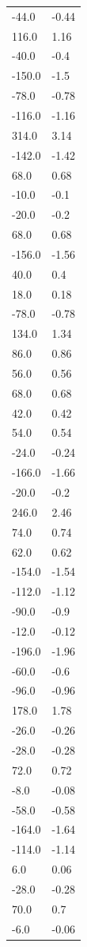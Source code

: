 \begin{longtable}{ll}
-44.0 & -0.44 \\
116.0 & 1.16 \\
-40.0 & -0.4 \\
-150.0 & -1.5 \\
-78.0 & -0.78 \\
-116.0 & -1.16 \\
314.0 & 3.14 \\
-142.0 & -1.42 \\
68.0 & 0.68 \\
-10.0 & -0.1 \\
-20.0 & -0.2 \\
68.0 & 0.68 \\
-156.0 & -1.56 \\
40.0 & 0.4 \\
18.0 & 0.18 \\
-78.0 & -0.78 \\
134.0 & 1.34 \\
86.0 & 0.86 \\
56.0 & 0.56 \\
68.0 & 0.68 \\
42.0 & 0.42 \\
54.0 & 0.54 \\
-24.0 & -0.24 \\
-166.0 & -1.66 \\
-20.0 & -0.2 \\
246.0 & 2.46 \\
74.0 & 0.74 \\
62.0 & 0.62 \\
-154.0 & -1.54 \\
-112.0 & -1.12 \\
-90.0 & -0.9 \\
-12.0 & -0.12 \\
-196.0 & -1.96 \\
-60.0 & -0.6 \\
-96.0 & -0.96 \\
178.0 & 1.78 \\
-26.0 & -0.26 \\
-28.0 & -0.28 \\
72.0 & 0.72 \\
-8.0 & -0.08 \\
-58.0 & -0.58 \\
-164.0 & -1.64 \\
-114.0 & -1.14 \\
6.0 & 0.06 \\
-28.0 & -0.28 \\
70.0 & 0.7 \\
-6.0 & -0.06 \\

\end{longtable}
